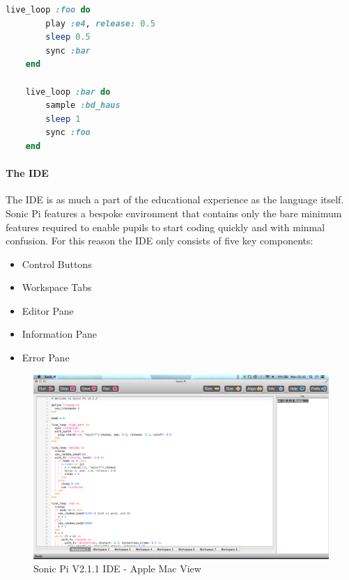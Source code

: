 \documentclass[11pt]{scrartcl}
\begin{document}
\begin{minipage}{\textwidth}
	\begin{lstlisting}[language = ruby]
	live_loop :foo do
	    play :e4, release: 0.5
	    sleep 0.5
	    sync :bar
	end

	live_loop :bar do
	    sample :bd_haus
	    sleep 1
	    sync :foo
	end
	\end{lstlisting}
\end{minipage}

\paragraph{The IDE}
The IDE is as much a part of the educational experience as the language 
itself. Sonic Pi features a bespoke environment that contains only the bare 
minimum features required to enable pupils to start coding quickly and with 
minmal confusion. For this reason the IDE only consists of five key components:

\begin{itemize}
	\item Control Buttons
	\item Workspace Tabs
	\item Editor Pane
	\item Information Pane
	\item Error Pane
\end{itemize}

\begin{figure}[t]
	\centering
	\includegraphics[width=\textwidth]{images/sonic-ide.png}
	\caption{Sonic Pi V2.1.1 IDE - Apple Mac View}
\end{figure}
\end{document}
